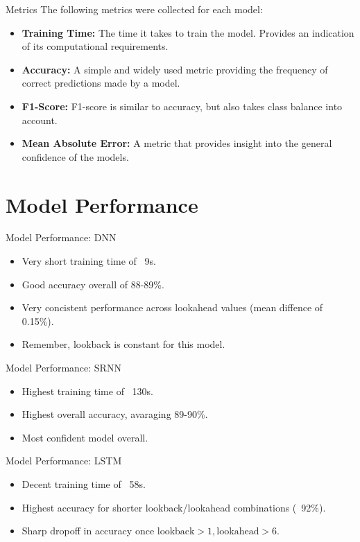 \documentclass[10pt]{beamer}
\begin{document}
\begin{frame}{Metrics}
The following metrics were collected for each model:
\begin{itemize}
	\item \textbf{Training Time:} The time it takes to train the model. Provides an indication of its computational requirements.
	\item \textbf{Accuracy:} A simple and widely used metric providing the frequency of correct predictions made by a model.
	\item \textbf{F1-Score:} F1-score is similar to accuracy, but also takes class balance into account.
	\item \textbf{Mean Absolute Error:} A metric that provides insight into the general confidence of the models.
\end{itemize}
\end{frame}


\section{Model Performance}


\begin{frame}{Model Performance: DNN}
\begin{itemize}
	\item Very short training time of ~9s.
	\item Good accuracy overall of 88-89\%.
	\item Very concistent performance across lookahead values (mean diffence of 0.15\%).
	\item Remember, lookback is constant for this model.
\end{itemize}
\end{frame}


\begin{frame}{Model Performance: SRNN}
\begin{itemize}
	\item Highest training time of ~130s.
	\item Highest overall accuracy, avaraging 89-90\%.
	\item Most confident model overall.
\end{itemize}
\end{frame}


\begin{frame}{Model Performance: LSTM}
\begin{itemize}
	\item Decent training time of ~58s.
	\item Highest accuracy for shorter lookback/lookahead combinations (~92\%).
	\item Sharp dropoff in accuracy once $\text{lookback} > 1, \text{lookahead} > 6$.
\end{itemize}
\end{frame}
\end{document}
